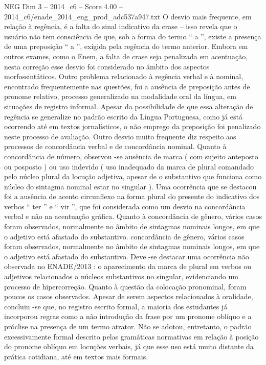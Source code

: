 \begin{textsample}{NEG Dim 3 – 2014\_c6 – Score 4.00 – 2014\_c6/enade\_2014\_eng\_prod\_adc537a947.txt}
O desvio mais frequente, em relação à regência, é a falta do sinal indicativo da crase – isso revela que o usuário não tem consciência de que, sob a forma do termo “ a ”, existe a presença de uma preposição “ a ”, exigida pela regência do termo anterior.
Embora em outros exames, como o Enem, a falta de crase seja penalizada em acentuação, nesta correção esse desvio foi considerado no âmbito dos aspectos morfossintáticos.
Outro problema relacionado à regência verbal e à nominal, encontrado frequentemente nas questões, foi a ausência de preposição antes de pronome relativo, processo generalizado na modalidade oral da língua, em situações de registro informal.
Apesar da possibilidade de que essa alteração de regência se generalize no padrão escrito da Língua Portuguesa, como já está ocorrendo até em textos jornalísticos, o não emprego da preposição foi penalizado neste processo de avaliação.
Outro desvio muito frequente diz respeito aos processos de concordância verbal e de concordância nominal.
Quanto à concordância de número, observou -se ausência de marca ( com sujeito anteposto ou posposto ) ou uso indevido ( uso inadequado da marca de plural comandado pelo núcleo plural da locução adjetiva, apesar de o substantivo que funciona como núcleo do sintagma nominal estar no singular ).
Uma ocorrência que se destacou foi a ausência de acento circunflexo na forma plural do presente do indicativo dos verbos “ ter ” e “ vir ”, que foi considerada como um desvio na concordância verbal e não na acentuação gráfica.
Quanto à concordância de gênero, vários casos foram observados, normalmente no âmbito de sintagmas nominais longos, em que o adjetivo está afastado do substantivo. concordância de gênero, vários casos foram observados, normalmente no âmbito de sintagmas nominais longos, em que o adjetivo está afastado do substantivo.
Deve -se destacar uma ocorrência não observada no ENADE/2013 : o aparecimento da marca de plural em verbos ou adjetivos relacionados a núcleos substantivos no singular, evidenciando um processo de hipercorreção.
Quanto à questão da colocação pronominal, foram poucos os casos observados.
Apesar de serem aspectos relacionados à oralidade, concluiu -se que, no registro escrito formal, a maioria dos estudantes já incorporou regras como a não introdução da frase por um pronome oblíquo e a próclise na presença de um termo atrator.
Não se adotou, entretanto, o padrão excessivamente formal descrito pelas gramáticas normativas em relação à posição do pronome oblíquo em locuções verbais, já que esse uso está muito distante da prática cotidiana, até em textos mais formais.

\end{textsample}
